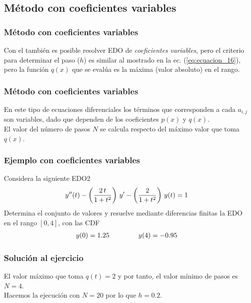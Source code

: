\subsection{Método con coeficientes variables}
\begin{frame}
\frametitle{Método con coeficientes variables}
Con el  también es posible resolver EDO de \emph{coeficientes variables}, pero el criterio para determinar el paso ($h$) es similar al mostrado en la
ec. (\ref{eq:ecuacion_16}), pero la función $q(x)$ que se evalúa es la máxima (valor absoluto) en el rango. 
\end{frame}
\begin{frame}
\frametitle{Método con coeficientes variables}
En este tipo de ecuaciones diferenciales los términos que corresponden a cada $a_{i, j}$ son variables, dado que dependen de los coeficientes $p(x)$ y $q(x)$.
\\
\bigskip
El valor del número de pasos $N$ se calcula respecto del máximo valor que toma $q(x)$.
\end{frame}
\begin{frame}
\frametitle{Ejemplo con coeficientes variables}
Considera la siguiente EDO2
\begin{align}
{y}^{\prime \prime}(t) - \left( \dfrac{2 \, t}{1 + t^{2}} \right) \, {y}^{\prime} - \left( \dfrac{2}{1 + t^{2}} \right) \, y(t) = 1
\label{eq:ecuacion_28}
\end{align}
\pause
Determina el conjunto de valores y resuelve mediante diferencias finitas la EDO en el rango $[0, 4]$, con las CDF
\begin{align*}
y(0) = 1.25 \hspace{1.5cm} y(4)= -0.95
\end{align*}
\end{frame}
\begin{frame}
\frametitle{Solución al ejercicio}
El valor máximo que toma $q(t) = 2$ y por tanto, el valor mínimo de pasos es $N=4$.
\\
\bigskip
Hacemos la ejecución con $N=20$ por lo que $h=0.2$.
\end{frame}
